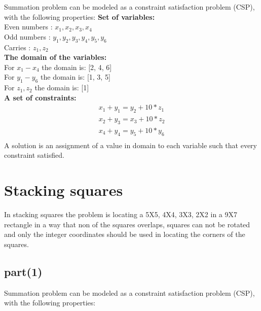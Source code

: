 \documentclass[]{article}
\begin{document}
Summation problem can be modeled as a constraint satisfaction problem (CSP), 
with the following properties:
\textbf{Set of variables:}\\
Even numbers : $x_1, x_2,x_3, x_4$\\
Odd numbers : $y_1, y_2, y_3, y_4, y_5,y_6$\\
Carries : $z_1, z_2$\\
\textbf{The domain of the variables:}\\
For {$x_1 - x_4$} the domain is: [2, 4, 6]\\
For {$y_1 - y_6$} the domain is: [1, 3, 5]\\
For {$z_1, z_2$} the domain is: [1]\\
\textbf{A set of constraints:}
\begin{align*}
x_1 + y_1 = y_2 + 10 * z_1 \\
x_2 + y_3 = x_3 + 10 * z_2 \\
x_4 + y_4 = y_5 + 10 * y_6 \\
\end{align*}
A solution is an assignment of a value in domain to each variable such that every constraint satisfied.

\section{Stacking squares}
In stacking squares the problem is locating a 5X5, 4X4, 3X3, 2X2 in a 9X7 rectangle in a way that non of the squares overlaps, squares can not be rotated and only the integer coordinates should be used in locating the corners of the squares.
\subsection*{part(1)}
Summation problem can be modeled as a constraint satisfaction problem (CSP), 
with the following properties:\\
\end{document}
